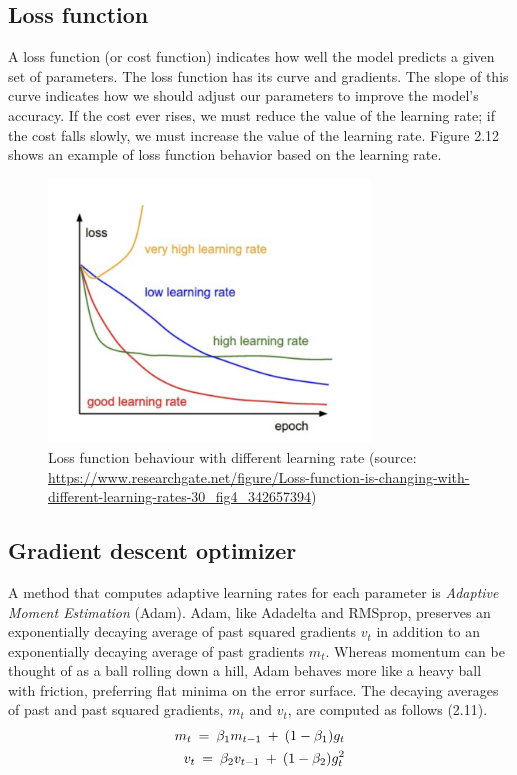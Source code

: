 \newpage
\subsection{Loss function}
\label{subsec:loss_function}
\hspace{0.5cm}A loss function (or cost function) indicates how well the model predicts a given set of parameters. The loss function has its curve and gradients. The slope of this curve indicates how we should adjust our parameters to improve the model's accuracy. If the cost ever rises, we must reduce the value of the learning rate; if the cost falls slowly, we must increase the value of the learning rate. Figure 2.12 shows an example of loss function behavior based on the learning rate.
\begin{figure}[!h]
	\centering
	\includegraphics[width=\linewidth, height=7cm,keepaspectratio]{figures/loss function DL.png}
   \caption{Loss function behaviour with different learning rate (source: \url{https://www.researchgate.net/figure/Loss-function-is-changing-with-different-learning-rates-30_fig4_342657394})}
\end{figure}

\subsection{Gradient descent optimizer}
\label{gradient_optimizer}
\hspace{0.5cm}A method that computes adaptive learning rates for each parameter is \textit{Adaptive Moment Estimation} (Adam). Adam, like Adadelta and RMSprop, preserves an exponentially decaying average of past squared gradients $v_t$ in addition to an exponentially decaying average of past gradients $m_t$. Whereas momentum can be thought of as a ball rolling down a hill, Adam behaves more like a heavy ball with friction, preferring flat minima on the error surface. The decaying averages of past and past squared gradients, $m_t$ and $v_t$, are computed as follows (2.11).
\begin{align}
    m_t \: = \: \beta_1 m_{t-1} \: + \: (1-\beta_1)g_{t}\\
    v_t \: = \: \beta_2 v_{t-1} \: + \: (1-\beta_2)g^2_t \notag
\end{align}


